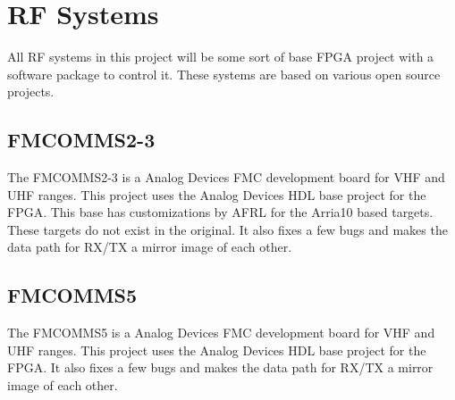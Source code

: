 \section{RF Systems}

\par
All RF systems in this project will be some sort of base FPGA project with a software package to control it.
These systems are based on various open source projects.

\subsection{FMCOMMS2-3}

\par
The FMCOMMS2-3 is a Analog Devices FMC development board for VHF and UHF ranges. This project uses the Analog
Devices HDL base project for the FPGA. This base has customizations by AFRL for the Arria10 based targets. These
targets do not exist in the original. It also fixes a few bugs and makes the data path for RX/TX a mirror image of
each other.

\subsection{FMCOMMS5}

\par
The FMCOMMS5 is a Analog Devices FMC development board for VHF and UHF ranges. This project uses the Analog
Devices HDL base project for the FPGA. It also fixes a few bugs and makes the data path for RX/TX a mirror image of
each other.
